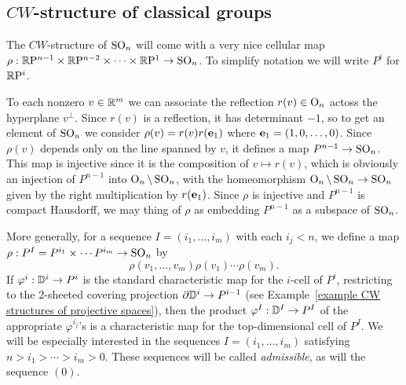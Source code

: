 \subsection{\texorpdfstring{$CW$}{CW}-structure of classical groups}\label{sec: CW structure of SO(n)}

The $CW$-structure of $\SO_n$ will come with a very nice cellular map $\rho:\RP^{n-1}\times \RP^{n-2}\times\cdots\times\RP^1\to \SO_n$. To simplify notation we will write $P^i$ for $\RP^i$.

To each nonzero $v\in\bbR^m$ we can associate the reflection $r(v)\in\Or_n$ actoss the hyperplane $v^\perp$. Since $r(v)$ is a reflection, it has determinant $-1$, so to get an element of $\SO_n$ we consider $\rho(v)=r(v)r(\bf{e}_1)$ where $\bf{e}_1=(1,0,\ldots,0)$. Since $\rho(v)$ depends only on the line spanned by $v$, it defines a map $P^{n-1}\to \SO_n$. This map is injective since it is the composition of $v\mapsto r(v)$, which is obviously an injection of $P^{n-1}$ into $\Or_n\setminus \SO_n$, with the homeomorphism $\Or_n\setminus \SO_n\to \SO_n$ given by the right multiplication by $r(\bf{e}_1)$. Since $\rho $ is injective and $P^{n-1}$ is compact Hausdorff, we may thing of $\rho$ as embedding $P^{n-1}$ as a subspace of $\SO_n$. 

More generally, for a sequence $I=(i_1,\ldots,i_m)$ with each $i_j<n$, we define a map $\rho:P^I=P^{i_1}\times\cdots P^{i_m}\to \SO_n$ by \[\rho(v_1,\ldots,v_m)\rho(v_1)\cdots \rho(v_m).\]
If $\varphi^i:\bbD^i\to P^i$ is the standard characteristic map for the $i$-cell of $P^i$, restricting to the 2-sheeted covering projection $\partial \bbD^i\to P^{i-1}$ (see Example~\ref{example CW structures of projective spaces}), then the product $\varphi^I:\bbD^I\to P^I$ of the appropriate $\varphi^{i_j}$'s is a characteristic map for the top-dimensional cell of $P^I$. We will be especially interested in the sequences $I=(i_1,\ldots,i_m)$ satisfying $n>i_1>\cdots >i_m>0$. These sequences will be called \emph{admissible}, as will the sequence $(0)$.

